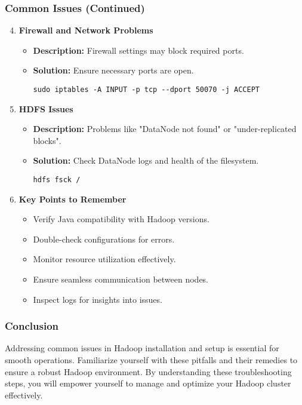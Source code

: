 \documentclass{beamer}
\begin{document}
\begin{frame}[fragile]
    \frametitle{Common Issues (Continued)}
    \begin{enumerate}
        \setcounter{enumi}{3} %
        \item \textbf{Firewall and Network Problems}
            \begin{itemize}
                \item \textbf{Description:} Firewall settings may block required ports.
                \item \textbf{Solution:} Ensure necessary ports are open.
                \begin{lstlisting}
sudo iptables -A INPUT -p tcp --dport 50070 -j ACCEPT
                \end{lstlisting}
            \end{itemize}

        \item \textbf{HDFS Issues}
            \begin{itemize}
                \item \textbf{Description:} Problems like "DataNode not found" or "under-replicated blocks".
                \item \textbf{Solution:} Check DataNode logs and health of the filesystem.
                \begin{lstlisting}
hdfs fsck /
                \end{lstlisting}
            \end{itemize}

        \item \textbf{Key Points to Remember}
            \begin{itemize}
                \item Verify Java compatibility with Hadoop versions.
                \item Double-check configurations for errors.
                \item Monitor resource utilization effectively.
                \item Ensure seamless communication between nodes.
                \item Inspect logs for insights into issues.
            \end{itemize}
    \end{enumerate}
\end{frame}

\begin{frame}[fragile]
    \frametitle{Conclusion}
    Addressing common issues in Hadoop installation and setup is essential 
    for smooth operations. Familiarize yourself with these pitfalls and 
    their remedies to ensure a robust Hadoop environment. By understanding 
    these troubleshooting steps, you will empower yourself to manage 
    and optimize your Hadoop cluster effectively.
\end{frame}
\end{document}
